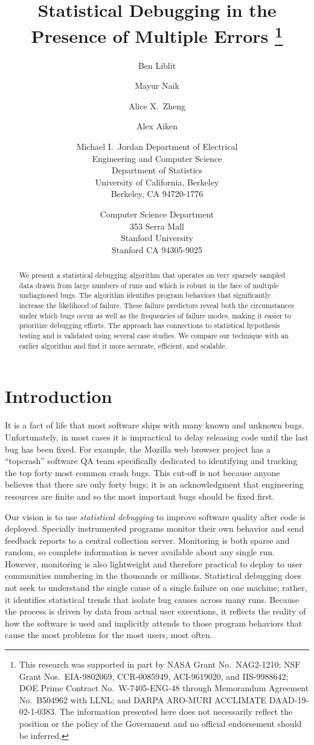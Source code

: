 \documentclass[draft]{sig-alternate}
\title{Statistical Debugging in the Presence of Multiple Errors
  \thanks{This research was supported in part by NASA Grant No.\
    NAG2-1210; NSF Grant Nos.\ EIA-9802069, CCR-0085949, ACI-9619020,
    and IIS-9988642; DOE Prime Contract No.\ W-7405-ENG-48 through
    Memorandum Agreement No.\ B504962 with LLNL; and DARPA ARO-MURI 
    ACCLIMATE DAAD-19-02-1-0383.  The information
    presented here does not necessarily reflect the position or the
    policy of the Government and no official endorsement should be
    inferred.}}
\author{%
  Ben Liblit \eecs
  \and Mayur Naik \stan
  \and Alice X.\ Zheng \eecs
  \and Alex Aiken \stan
  \and Michael I.\ Jordan \both
  \moreauthors
  \eecs Department of Electrical \\
  Engineering and Computer Science \\
  \stat Department of Statistics \\
  University of California, Berkeley \\
  Berkeley, CA 94720-1776
  \and
  \stan Computer Science Department \\
  353 Serra Mall \\
  Stanford University \\
  Stanford CA 94305-9025
}
\newcommand{\termdef}[1]{\textit{#1}}
\begin{document}
\maketitle

\begin{abstract}
  We present a statistical debugging algorithm that operates on very
  sparsely sampled data drawn from large numbers of runs and which is
  robust in the face of multiple undiagnosed bugs.  The algorithm
  identifies program behaviors that significantly increase the
  likelihood of failure.  These failure predictors reveal both the
  circumstances under which bugs occur as well as the frequencies of
  failure modes, making it easier to prioritize debugging efforts.
  The approach has connections to statistical hypothesis testing and
  is validated using several case studies.  We compare our technique
  with an earlier algorithm and find it more accurate, efficient, and
  scalable.
\end{abstract}






\section{Introduction}
\label{sec:introduction}

It is a fact of life that most software ships with many known and
unknown bugs.  Unfortunately, in most cases it is impractical to delay
releasing code until the last bug has been fixed.  For example, the
Mozilla web browser project has a ``topcrash'' software QA team
specifically dedicated to identifying and tracking the top forty most
common crash bugs.  This cut-off is not because anyone believes that
there are only forty bugs; it is an acknowledgment that engineering
resources are finite and so the most important bugs should be fixed
first.

Our vision is to use \termdef{statistical debugging} to improve
software quality after code is deployed.  Specially instrumented
programs monitor their own behavior and send feedback reports to a
central collection server.  Monitoring is both sparse and random, so
complete information is never available about any single run.
However, monitoring is also lightweight and therefore practical to
deploy to user communities numbering in the thousands or millions.
Statistical debugging does not seek to understand the single cause of
a single failure on one machine; rather, it identifies statistical
trends that isolate bug causes across many runs.  Because the process
is driven by data from actual user executions, it reflects the reality
of how the software is used and implicitly attends to those program
behaviors that cause the most problems for the most users, most often.
\end{document}

